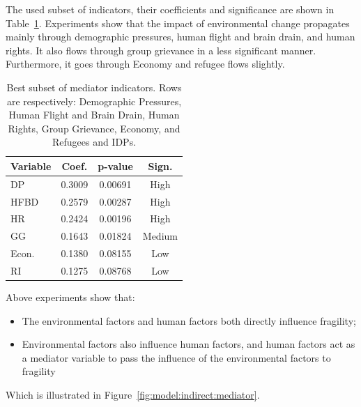 {The used subset of indicators, their coefficients and significance are shown in Table~\ref{tab:exp:mediator:subset}.
Experiments show that the impact of environmental change propagates mainly through demographic pressures, human flight and brain drain, and human rights. It also flows through group grievance in a less significant manner. Furthermore, it goes through Economy and refugee flows slightly. 

\begin{table}[htbp]
   \centering 
   \begin{tabular}{|l|ccc|} \hline
      Variable & Coef. & p-value & Sign. \\ \hline 
       DP & 0.3009 & 0.00691 & High \\ \hline
       HFBD & 0.2579 & 0.00287 & High \\ \hline
       HR & 0.2424 & 0.00196 & High \\ \hline
       GG & 0.1643 & 0.01824 & Medium \\ \hline
       Econ. & 0.1380 & 0.08155 & Low \\ \hline
       RI & 0.1275 & 0.08768 & Low \\ \hline
   \end{tabular}
   \caption{Best subset of mediator indicators. Rows are respectively: Demographic Pressures, Human Flight and Brain Drain, Human Rights, Group Grievance, Economy, and Refugees and IDPs.}
   \label{tab:exp:mediator:subset}
\end{table}

 Above experiments show that:
\begin{itemize}
   \item The environmental factors and human factors both directly influence fragility;
   \item Environmental factors also influence human factors, and human factors act as a mediator variable to pass the influence of the environmental factors to fragility 
\end{itemize}
Which is illustrated in Figure~\ref{fig:model:indirect:mediator}. 
}


